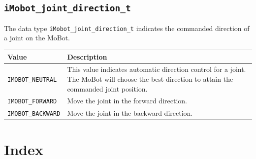 \documentclass{article}
\begin{document}
\subsection{\texttt{iMobot\_joint\_direction\_t}}
The data type \texttt{iMobot\_joint\_direction\_t} indicates the commanded direction 
of a joint on the MoBot.

\begin{tabular}{p{3cm}p{7cm}} \hline 
Value & Description \\
\hline 
\texttt{IMOBOT\_NEUTRAL} & This value indicates automatic direction control for a joint. 
The MoBot will choose the best direction to attain the commanded joint position. \\
\texttt{IMOBOT\_FORWARD} & Move the joint in the forward direction. \\
\texttt{IMOBOT\_BACKWARD} & Move the joint in the backward direction. \\
\end{tabular}
\section{Index}
\printindex
\end{document}
